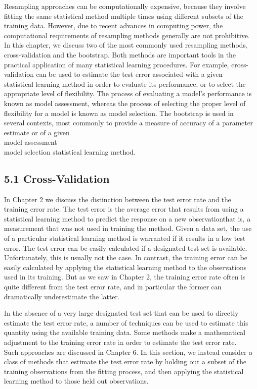 \documentclass[10pt]{article}
\begin{document}
Resampling approaches can be computationally expensive, because they involve fitting the same statistical method multiple times using different subsets of the training data. However, due to recent advances in computing power, the computational requirements of resampling methods generally are not prohibitive. In this chapter, we discuss two of the most commonly used resampling methods, cross-validation and the bootstrap. Both methods are important tools in the practical application of many statistical learning procedures. For example, cross-validation can be used to estimate the test error associated with a given statistical learning method in order to evaluate its performance, or to select the appropriate level of flexibility. The process of evaluating a model's performance is known as model assessment, whereas the process of selecting the proper level of flexibility for a model is known as model selection. The bootstrap is used in several contexts, most commonly to provide a measure of accuracy of a parameter estimate or of a given\\
model assessment\\
model selection statistical learning method.

\subsection*{5.1 Cross-Validation}
In Chapter 2 we discuss the distinction between the test error rate and the training error rate. The test error is the average error that results from using a statistical learning method to predict the response on a new observationthat is, a measurement that was not used in training the method. Given a data set, the use of a particular statistical learning method is warranted if it results in a low test error. The test error can be easily calculated if a designated test set is available. Unfortunately, this is usually not the case. In contrast, the training error can be easily calculated by applying the statistical learning method to the observations used in its training. But as we saw in Chapter 2, the training error rate often is quite different from the test error rate, and in particular the former can dramatically underestimate the latter.

In the absence of a very large designated test set that can be used to directly estimate the test error rate, a number of techniques can be used to estimate this quantity using the available training data. Some methods make a mathematical adjustment to the training error rate in order to estimate the test error rate. Such approaches are discussed in Chapter 6. In this section, we instead consider a class of methods that estimate the test error rate by holding out a subset of the training observations from the fitting process, and then applying the statistical learning method to those held out observations.
\end{document}
